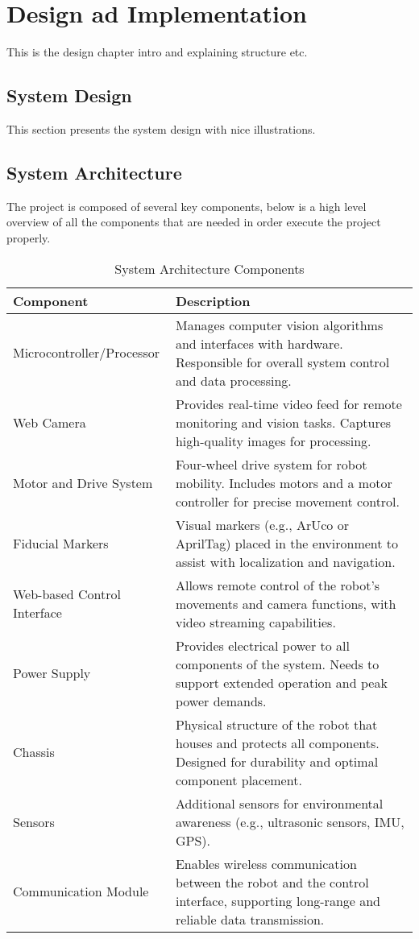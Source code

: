 \chapter{\label{ch:ch4} Design ad Implementation}

This is the design chapter intro and explaining structure etc.

\section{\label{sec:ch4_firstsec}System Design}

This section presents the system design with nice illustrations.
\section{\label{sec:sys_architecture} System Architecture}

The project is composed of several key components, below is a high level overview of all the components that are needed in order execute the project properly.

\begin{table}[ht]
\centering
\caption{System Architecture Components}
\label{tab:system_architecture}
\begin{tabular}{|p{5cm}|p{10cm}|}
\hline
\textbf{Component} & \textbf{Description} \\ \hline
Microcontroller/Processor & Manages computer vision algorithms and interfaces with hardware. Responsible for overall system control and data processing. \\ \hline
Web Camera & Provides real-time video feed for remote monitoring and vision tasks. Captures high-quality images for processing. \\ \hline
Motor and Drive System & Four-wheel drive system for robot mobility. Includes motors and a motor controller for precise movement control.\\ \hline
Fiducial Markers & Visual markers (e.g., ArUco or AprilTag) placed in the environment to assist with localization and navigation.\\ \hline
Web-based Control Interface & Allows remote control of the robot’s movements and camera functions, with video streaming capabilities. \\ \hline
Power Supply & Provides electrical power to all components of the system. Needs to support extended operation and peak power demands. \\ \hline
Chassis & Physical structure of the robot that houses and protects all components. Designed for durability and optimal component placement.  \\ \hline
Sensors & Additional sensors for environmental awareness (e.g., ultrasonic sensors, IMU, GPS).\\  \hline
Communication Module & Enables wireless communication between the robot and the control interface, supporting long-range and reliable data transmission. \\ \hline
\end{tabular}
\end{table}
